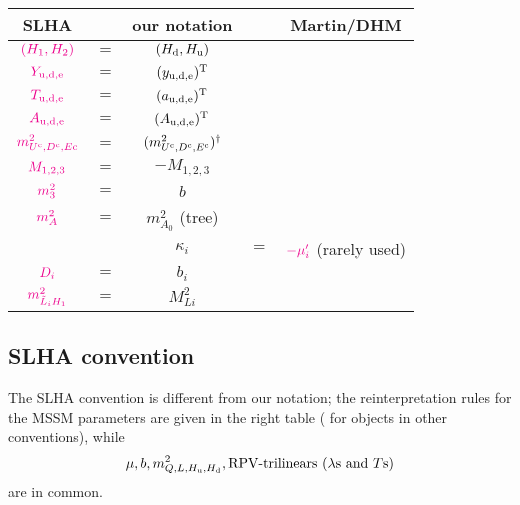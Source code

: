 \documentclass[CheatSheet]{subfiles}
\begin{document}
\newpage
\begin{wraptable}{r}{200pt}\vspace{-3em}
 \begin{tabular}[t]{c@{\,}c@{\,}c@{\,}c@{\,}c}\toprule
 SLHA  && our notation && Martin/DHM\\\midrule
 ${\color{magenta}(H_1, H_2)}$              &$=$& $(H_{\mathrm{d}}, H_{\mathrm{u}})$ \\\midrule
 ${\color{magenta}Y_{\mathrm{u,d,e}}}$      &$=$& $(y_{\mathrm{u,d,e}})^{\mathrm{T}}$\\
 ${\color{magenta}T_{\mathrm{u,d,e}}}$      &$=$& $(a_{\mathrm{u,d,e}})^{\mathrm{T}}$\\
 ${\color{magenta}A_{\mathrm{u,d,e}}}$      &$=$& $(A_{\mathrm{u,d,e}})^{\mathrm{T}}$\\
 ${\color{magenta}m^2_{U^{\mathrm{c}},D^{\mathrm{c}}, E\mathrm{c}}}$ &$=$& $(m^2_{U^{\mathrm{c}},D^{\mathrm{c}}, E^{\mathrm{c}}})^\dagger$\\
 ${\color{magenta}M_{1,2,3}}$               &$=$& $-M_{1,2,3}$\\
 ${\color{magenta}m_3^2}$                   &$=$& $b$\\
 ${\color{magenta}m_A^2}$                   &$=$& $m^2_{A_0}$ (tree)\\\midrule
 &&$\kappa_i$ &$=$& ${\color{magenta}-\mu_i'}$ \footnotesize{(rarely used)}\\
 ${\color{magenta}D_i}$                     &$=$& $b_i$\\
 ${\color{magenta}m^2_{\tilde L_iH_1}}$     &$=$& $M^2_{Li}$ \\\bottomrule
 \end{tabular}
\end{wraptable}

\subsection{SLHA convention}
The SLHA convention \cite{SLHA} is different from our notation; the reinterpretation rules for the MSSM parameters are given in the right table  (\textbf{} for objects in other conventions), while
\begin{equation*}
  \mu, b, m^2_{Q, L, H_{\mathrm{u}}, H_{\mathrm{d}}}, \text{RPV-trilinears ($\lambda$s and $T$s)}
\end{equation*}
 are in common.



\clearpage
\end{document}
